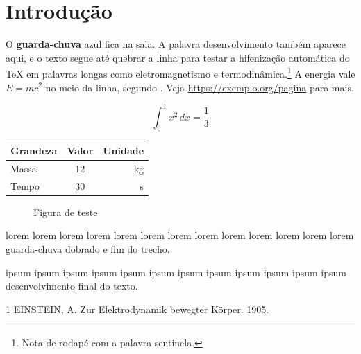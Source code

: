 \documentclass[12pt,a4paper,article,oneside]{abntex2}
\begin{document}
\section{Introdu\c{c}\~ao}
O \textbf{guarda-chuva} azul fica na sala. A palavra desenvolvimento tamb\'em aparece aqui, e o texto segue at\'e quebrar a linha para testar a hifeniza\c{c}\~ao autom\'atica do TeX em palavras longas como eletromagnetismo e termodin\^amica.\footnote{Nota de rodap\'e com a palavra sentinela.}
A energia vale $E = mc^2$ no meio da linha, segundo \cite{einstein1905}. Veja \url{https://exemplo.org/pagina} para mais.

\begin{equation}
  \int_0^1 x^2\,dx = \frac{1}{3}
\end{equation}

\begin{center}
\begin{tabular}{lcr}
\hline
Grandeza & Valor & Unidade \tabularnewline
\hline
Massa & 12 & kg \tabularnewline
Tempo & 30 & s \tabularnewline
\hline
\end{tabular}
\end{center}

\begin{figure}[h]
\centering
\fbox{\rule{0pt}{2cm}\rule{4cm}{0pt}}
\caption{Figura de teste}
\end{figure}



\noindent lorem lorem lorem lorem lorem lorem lorem lorem lorem lorem lorem lorem lorem guarda-chuva dobrado e fim do trecho.


\noindent ipsum ipsum ipsum ipsum ipsum ipsum ipsum ipsum ipsum ipsum ipsum ipsum desen\-volvimento final do texto.


\begin{thebibliography}{1}
 EINSTEIN, A. Zur Elektrodynamik bewegter K\"orper. 1905.
\end{thebibliography}
\end{document}
